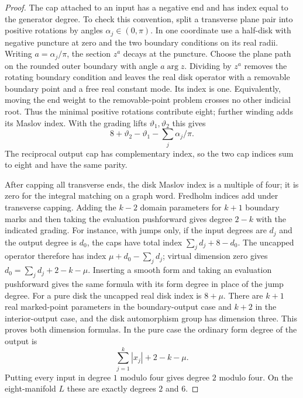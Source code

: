\documentclass[11pt]{article}
\theoremstyle{definition}
\theoremstyle{remark}
\numberwithin{equation}{section}
\begin{document}
\begin{proof}
The cap attached to an input has a negative end and has index equal to
the generator degree.  To check this convention, split a transverse
plane pair into positive rotations by angles
$\alpha_j\in(0,\pi)$.  In one coordinate use a half-disk with negative
puncture at zero and the two boundary conditions on its real radii.
Writing $a=\alpha_j/\pi$, the section $z^a$ decays at the puncture.
Choose the plane path on the rounded outer boundary with angle
$a\arg z$.
Dividing by $z^a$ removes the rotating boundary condition and leaves the
real disk operator with a removable boundary point and a free real
constant mode.  Its index is one.  Equivalently, moving the end weight
to the removable-point problem crosses no other indicial root.  Thus
the minimal positive rotations contribute eight; further winding adds
its Maslov index.  With the grading lifts $\vartheta_1,\vartheta_2$ this
gives
\[
 8+\vartheta_2-\vartheta_1-\sum_j\alpha_j/\pi.
\]
The reciprocal output cap has complementary index, so the two cap
indices sum to eight and have the same parity.

After capping all transverse ends, the disk Maslov index is a multiple
of four; it is zero for the integral matching on a graph word.
Fredholm indices add under transverse capping.  Adding the $k-2$
domain parameters for $k+1$ boundary marks and then taking the
evaluation pushforward gives degree $2-k$ with the indicated grading.
For instance, with jumps only, if the input degrees are $d_j$ and
the output degree is $d_0$, the caps have total index
$\sum_jd_j+8-d_0$.  The uncapped operator therefore has index
$\mu+d_0-\sum_jd_j$; virtual dimension zero gives
$d_0=\sum_jd_j+2-k-\mu$.  Inserting a smooth form and taking an
evaluation pushforward gives the same formula with its form degree
in place of the jump degree.
For a pure disk the uncapped real disk index is $8+\mu$.
There are $k+1$ real marked-point parameters in the boundary-output
case and $k+2$ in the interior-output case, and the disk automorphism
group has dimension three.  This proves both dimension formulas.
In the pure case the ordinary form degree of the output is
\[
 \sum_{j=1}^k|x_j|+2-k-\mu.
\]
Putting every input in degree $1$ modulo four gives degree $2$ modulo
four.  On the eight-manifold $L$ these are exactly degrees $2$ and $6$.
\end{proof}
\end{document}
